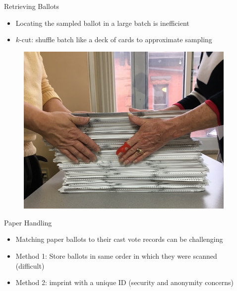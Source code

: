 \documentclass[final]{beamer}
\newlength{\onecolwid}
\newlength{\twocolwid}
\begin{document}
\begin{frame}[t]
\begin{columns}[t]
\begin{column}{\twocolwid}
\begin{columns}[t,totalwidth=\twocolwid]
\begin{column}{\onecolwid}

\end{column} %

\begin{column}{\onecolwid} %


\begin{block}{Retrieving Ballots}

\begin{itemize}
\item Locating the sampled ballot in a large batch is inefficient
\item $k$-cut: shuffle batch like a deck of cards to approximate sampling \cite{sridhar_kcut_2018}
\end{itemize}
\begin{figure}
\includegraphics[width=0.7\linewidth]{../photo/batch}
\end{figure}
\end{block}


\begin{block}{Paper Handling}
\begin{itemize}
\item Matching paper ballots to their cast vote records can be challenging
\item Method 1: Store ballots in same order in which they were scanned (difficult)
\item Method 2: imprint with a unique ID (security and anonymity concerns)
\end{itemize}
\end{block}


\end{column}
\end{columns}
\end{column}
\end{columns}
\end{frame}
\end{document}
